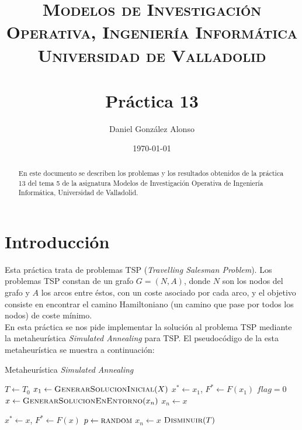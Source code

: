 \documentclass[a4paper,11pt]{article}
\title{
	\vspace{-25pt}
	\normalfont \Large \textsc{
		Modelos de Investigación Operativa,
        Ingeniería Informática\\
        Universidad de Valladolid
	}\\[10pt]
	\horrule{1pt}\\[10pt]
	\huge \textbf{
		Práctica 13
	}\\
	\horrule{1pt}
}
\author{
	\normalfont \Large Daniel González Alonso
}
\date{
	\normalfont \large \today
}
\let\oldReturn\Return
\renewcommand{\Return}{\State\oldReturn}
\begin{document}
\maketitle

\begin{abstract}
	En este documento se describen los problemas y los resultados obtenidos de la práctica 13 del tema 5 de la asignatura Modelos de Investigación Operativa de Ingeniería Informática, Universidad de Valladolid.
\end{abstract}

\section{Introducción}
Esta práctica trata de problemas TSP (\textit{Travelling Salesman Problem}). Los problemas TSP constan de un grafo ${G=(N,A)}$, donde ${N}$ son los nodos del grafo y ${A}$ los arcos entre éstos, con un coste asociado por cada arco, y el objetivo consiste en encontrar el camino Hamiltoniano (un camino que pase por todos los nodos) de coste mínimo.\\

En esta práctica se nos pide implementar la solución al problema TSP mediante la metaheurística \textit{Simulated Annealing} para TSP. El pseudocódigo de la esta metaheurística se muestra a continuación:

\begin{algorithm}[!htbp]
\caption{Metaheurística \textit{Simulated Annealing}}
\label{alg_sim_annealing}
\begin{algorithmic}[1]
	\State ${T \gets T_{0}}$
    \State ${x_{1} \gets \Call{GenerarSolucionInicial}{X}}$
    \State ${x^{\ast} \gets x_{1}}$, ${F^{\ast} \gets F(x_{1})}$
    \State ${flag = 0}$
		\State ${x \gets \Call{GenerarSolucionEnEntorno}{x_{n}}}$
        	\State ${x_{n} \gets x}$
        \EndIf
\end{algorithmic}
\end{algorithm}

\newpage
\begin{algorithm}[!htbp]
\begin{algorithmic}[1]
        	\State ${x^{\ast} \gets x}$, ${F^{\ast} \gets F(x)}$
        \Else
        	\State ${p \gets \Call{random}{}}$	
            	\State ${x_{n} \gets x}$
            \EndIf
        \EndIf
        \State ${\Call{Disminuir}{T}}$
    \EndWhile
\EndFunction
\end{algorithmic}
\end{algorithm}
\end{document}
